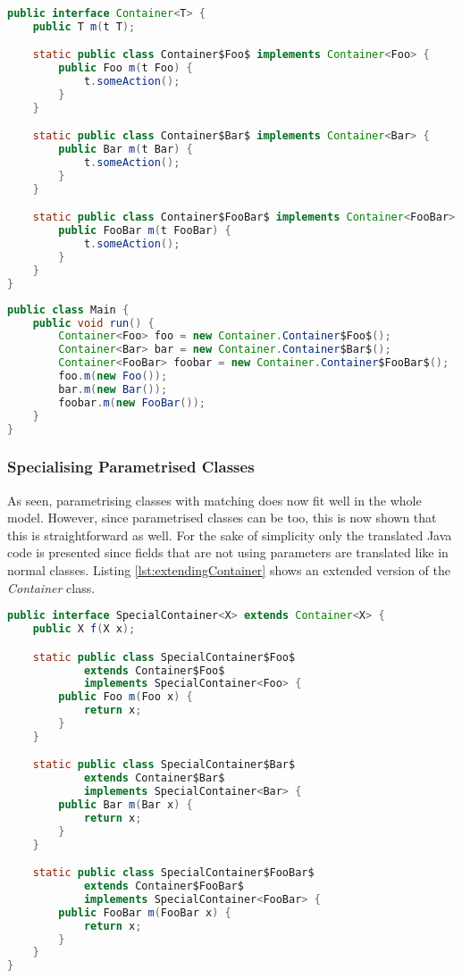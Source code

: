 \begin{lstlisting}[float,language=java,caption=Container class translated to Java,label=lst:parametrisationJava]
public interface Container<T> {
	public T m(t T);

	static public class Container$Foo$ implements Container<Foo> {
		public Foo m(t Foo) {
			t.someAction();
		}
	}

	static public class Container$Bar$ implements Container<Bar> {
		public Bar m(t Bar) {
			t.someAction();
		}
	}

	static public class Container$FooBar$ implements Container<FooBar> {
		public FooBar m(t FooBar) {
			t.someAction();
		}
	}
}
\end{lstlisting}

\begin{lstlisting}[float,language=java,caption=Use of parametised classes in Java,label=lst:useParametrisationJava]
public class Main {
	public void run() {
		Container<Foo> foo = new Container.Container$Foo$();
		Container<Bar> bar = new Container.Container$Bar$();
		Container<FooBar> foobar = new Container.Container$FooBar$();
		foo.m(new Foo());
		bar.m(new Bar());
		foobar.m(new FooBar());
	}
}
\end{lstlisting}

\subsubsection{Specialising Parametrised Classes}
As seen, parametrising classes with matching does now fit well in
the whole model. However, since parametrised classes can be too,
this is now shown that this is straightforward as well. For the
sake of simplicity only the translated Java code is presented since
fields that are not using parameters are translated like in normal
classes. Listing \ref{lst:extendingContainer} shows an extended version
of the \emph{Container} class.

\begin{lstlisting}[float,language=java,caption=Extending a container class translated to Java,label=lst:extendingContainer]
public interface SpecialContainer<X> extends Container<X> {
	public X f(X x);

	static public class SpecialContainer$Foo$ 
			extends Container$Foo$ 
			implements SpecialContainer<Foo> {
		public Foo m(Foo x) {
			return x;
		}
	}

	static public class SpecialContainer$Bar$ 
			extends Container$Bar$ 
			implements SpecialContainer<Bar> {
		public Bar m(Bar x) {
			return x;
		}
	}

	static public class SpecialContainer$FooBar$ 
			extends Container$FooBar$ 
			implements SpecialContainer<FooBar> {
		public FooBar m(FooBar x) {
			return x;
		}
	}
}
\end{lstlisting}

